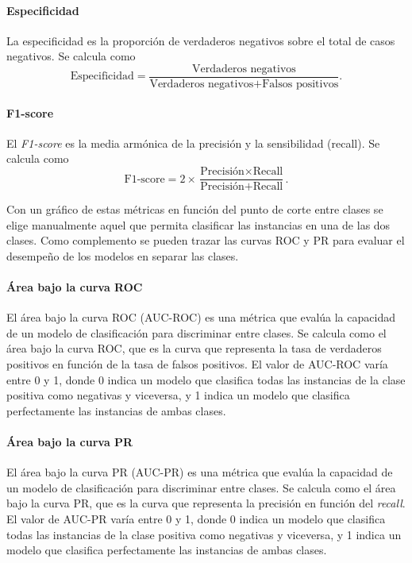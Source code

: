\documentclass[a4paper]{report}
\begin{document}
\paragraph{Especificidad}
La especificidad es la proporción de verdaderos negativos sobre el total de casos negativos.
Se calcula como
\begin{equation}
	\text{Especificidad} = \frac{\text{Verdaderos negativos}}{\text{Verdaderos negativos} + \text{Falsos positivos}}.
\end{equation}

\paragraph{F1-score}
El \emph{F1-score} es la media armónica de la precisión y la sensibilidad (recall).
Se calcula como
\begin{equation}
	\text{F1-score} = 2 \times \frac{\text{Precisión} \times \text{Recall}}{\text{Precisión} + \text{Recall}}.
\end{equation}

Con un gráfico de estas métricas en función del punto de corte entre clases se elige manualmente aquel que permita clasificar las instancias en una de las dos clases.
Como complemento se pueden trazar las curvas ROC y PR para evaluar el desempeño de los modelos en separar las clases.


\paragraph{Área bajo la curva ROC}
El área bajo la curva ROC (AUC-ROC) es una métrica que evalúa la capacidad de un modelo de clasificación para discriminar entre clases.
Se calcula como el área bajo la curva ROC, que es la curva que representa la tasa de verdaderos positivos en función de la tasa de falsos positivos.
El valor de AUC-ROC varía entre 0 y 1, donde 0 indica un modelo que clasifica todas las instancias de la clase positiva como negativas y viceversa, y 1 indica un modelo que clasifica perfectamente las instancias de ambas clases.


\paragraph{Área bajo la curva PR}
El área bajo la curva PR (AUC-PR) es una métrica que evalúa la capacidad de un modelo de clasificación para discriminar entre clases.
Se calcula como el área bajo la curva PR, que es la curva que representa la precisión en función del \emph{recall}.
El valor de AUC-PR varía entre 0 y 1, donde 0 indica un modelo que clasifica todas las instancias de la clase positiva como negativas y viceversa, y 1 indica un modelo que clasifica perfectamente las instancias de ambas clases.
\end{document}
